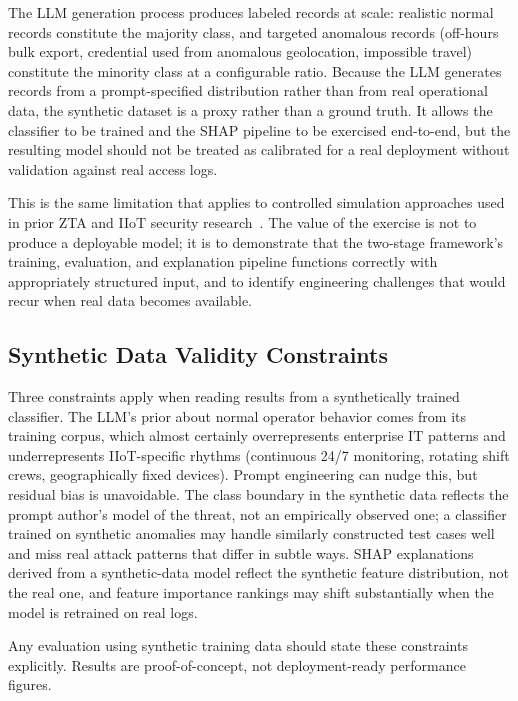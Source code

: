 \documentclass[conference]{IEEEtran}
\begin{document}
The LLM generation process produces labeled records at scale: realistic normal records constitute the majority class, and targeted anomalous records (off-hours bulk export, credential used from anomalous geolocation, impossible travel) constitute the minority class at a configurable ratio. Because the LLM generates records from a prompt-specified distribution rather than from real operational data, the synthetic dataset is a proxy rather than a ground truth. It allows the classifier to be trained and the SHAP pipeline to be exercised end-to-end, but the resulting model should not be treated as calibrated for a real deployment without validation against real access logs.

This is the same limitation that applies to controlled simulation approaches used in prior ZTA and IIoT security research~\cite{zanasi2024, laghari2025}. The value of the exercise is not to produce a deployable model; it is to demonstrate that the two-stage framework's training, evaluation, and explanation pipeline functions correctly with appropriately structured input, and to identify engineering challenges that would recur when real data becomes available.

\subsection{Synthetic Data Validity Constraints}

Three constraints apply when reading results from a synthetically trained classifier. The LLM's prior about normal operator behavior comes from its training corpus, which almost certainly overrepresents enterprise IT patterns and underrepresents IIoT-specific rhythms (continuous 24/7 monitoring, rotating shift crews, geographically fixed devices). Prompt engineering can nudge this, but residual bias is unavoidable. The class boundary in the synthetic data reflects the prompt author's model of the threat, not an empirically observed one; a classifier trained on synthetic anomalies may handle similarly constructed test cases well and miss real attack patterns that differ in subtle ways. SHAP explanations derived from a synthetic-data model reflect the synthetic feature distribution, not the real one, and feature importance rankings may shift substantially when the model is retrained on real logs.

Any evaluation using synthetic training data should state these constraints explicitly. Results are proof-of-concept, not deployment-ready performance figures.
\end{document}

